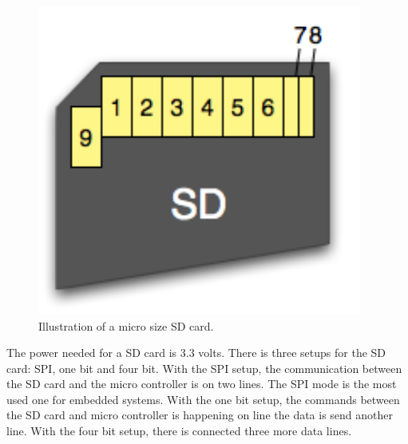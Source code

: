 \begin{minipage}{\linewidth}
\begin{minipage}{0.65\linewidth}
\begin{table} [H]
\begin{tabular}{|l|l|l|l|}
				\end{tabular}							
			\end{table}			
      \end{minipage}
      \hspace{0.03\linewidth}
      \begin{minipage}{0.30\linewidth}
          \begin{figure}[H]
              \includegraphics[width=0.95\textwidth]{figures/sdcardpinout}
              \caption{Illustration of a micro size SD card.} %
              \label{SDcardpinout}
          \end{figure}
      \end{minipage}
      
  \end{minipage}



The power needed for a SD card is 3.3 volts. There is three setups for the SD card: SPI, one bit and four bit. With the SPI setup, the communication between the SD card and the micro controller is on two lines. The SPI mode is the most used one for embedded systems.
With the one bit setup, the commands between the SD card and micro controller is happening on line the data is send another line. With the four bit setup, there is connected three more data lines.

